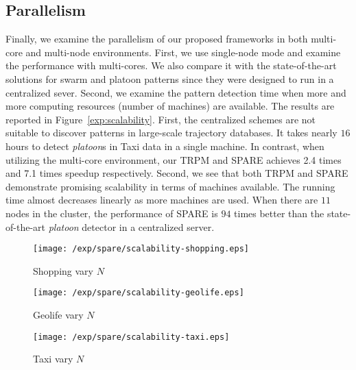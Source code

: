 \subsection{Parallelism}
Finally, we examine the parallelism of our proposed frameworks in both multi-core and multi-node environments. First, we use single-node mode and examine the performance with multi-cores. We also compare it with the  state-of-the-art solutions for swarm and platoon patterns since they were designed  to run in a centralized sever. Second, we examine the pattern detection time when more and more computing resources (number of machines) are available. The results are reported in Figure~\ref{exp:scalability}. First, the centralized schemes are not suitable to discover patterns in large-scale trajectory databases. It takes nearly $16$ hours to detect \emph{platoon}s in Taxi data in a single machine. In contrast, when utilizing the multi-core environment, our TRPM and SPARE achieves 2.4 times and 7.1 times speedup respectively. Second, we see that both TRPM and SPARE demonstrate promising scalability in terms of machines available. The running time almost decreases linearly as more machines are used. When there are $11$ nodes in the cluster, the performance of SPARE is $94$ times better than the state-of-the-art \emph{platoon} detector in a centralized server.

\begin{figure*}[t]
\centering
\begin{subfigure}[b]{0.32\textwidth}
    \texttt{[image: /exp/spare/scalability-shopping.eps]}
        \caption{Shopping vary $N$}
    \end{subfigure}
 	 \begin{subfigure}[b]{0.32\textwidth}
        \texttt{[image: /exp/spare/scalability-geolife.eps]}
        \caption{Geolife vary $N$}
    \end{subfigure}
    	 \begin{subfigure}[b]{0.32\textwidth}
        \texttt{[image: /exp/spare/scalability-taxi.eps]}
        \caption{Taxi vary $N$}
    \end{subfigure}
 \caption{Comparisons among TRMP, SPARE and Platoon}
 \label{exp:scalability}
\end{figure*}